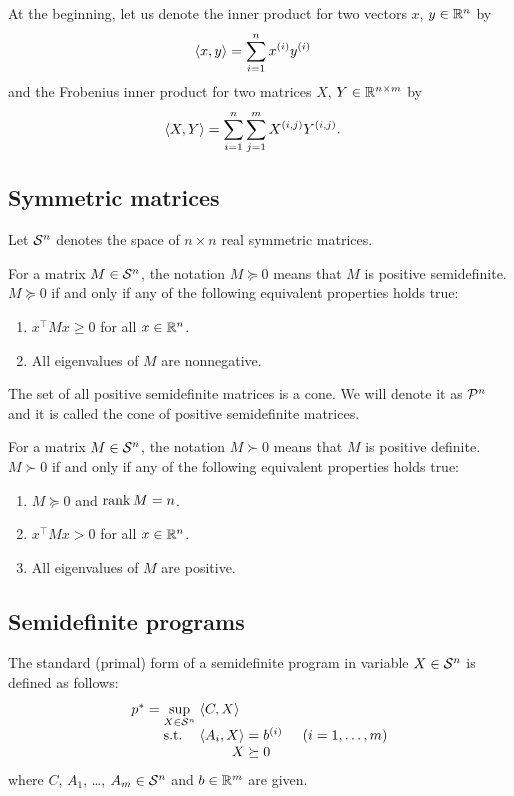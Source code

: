 At the beginning, let us denote the inner product for two vectors $x$, $y \in\mathbb{R}^n$ by
\begin{align}
  \langle x, y\rangle &= \sum_{i=1}^n x^{(i)}y^{(i)}
\end{align}
and the Frobenius inner product for two matrices $X$, $Y\in\mathbb{R}^{n\times m}$ by
\begin{align}
  \langle X, Y\rangle &= \sum_{i=1}^n \sum_{j=1}^m X^{(i,j)}Y^{(i,j)}.
\end{align}

\subsection{Symmetric matrices}
Let $\mathcal{S}^n$ denotes the space of $n\times n$ real symmetric matrices.

For a matrix $M\in\mathcal{S}^n$, the notation $M \succeq 0$ means that $M$ is positive semidefinite.
$M \succeq 0$ if and only if any of the following equivalent properties holds true:
\begin{enumerate}
  \item $x^\top Mx \geq 0$ for all $x \in \mathbb{R}^n$.
  \item All eigenvalues of $M$ are nonnegative.
\end{enumerate}
The set of all positive semidefinite matrices is a cone.
We will denote it as $\mathcal{P}^n$ and it is called the cone of positive semidefinite matrices.

For a matrix $M\in\mathcal{S}^n$, the notation $M \succ 0$ means that $M$ is positive definite.
$M \succ 0$ if and only if any of the following equivalent properties holds true:
\begin{enumerate}
  \item $M \succeq 0$ and $\operatorname{rank} M = n$.
  \item $x^\top Mx > 0$ for all $x \in \mathbb{R}^n$.
  \item All eigenvalues of $M$ are positive.
\end{enumerate}

\subsection{Semidefinite programs}
The standard (primal) form of a semidefinite program in variable $X\in\mathcal{S}^n$ is defined as follows:
\begin{align}
  \arraycolsep=1.4pt
  \begin{array}{rclrcl@{\hskip0.5cm}l}
    p^* &=& \displaystyle \sup_{X\in\Sym^n} & \multicolumn{3}{l}{\langle C,X\rangle} \\
    && \text{s.t.} & \langle A_i, X\rangle &=& b\ind i & (i = 1,\ldots,m)\\
    &&& X &\succeq& 0
  \end{array}
\end{align}
where $C$, $A_1$, \ldots, $A_m \in \mathcal{S}^n$ and $b\in\mathbb{R}^m$ are given.

